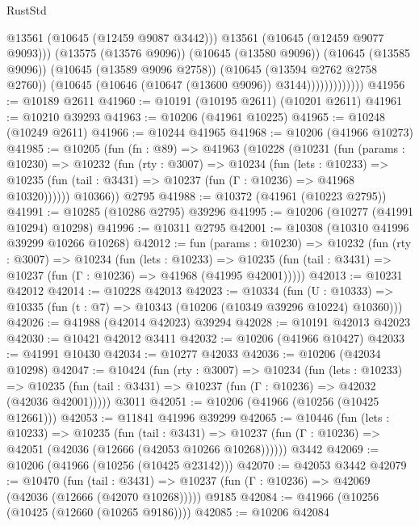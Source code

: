 \begin{lexlean}{RustStd}
\begin{coremodule}
                              @13561
                              (@10645 (@12459 @9087 @3442)))
                            @13561
                            (@10645 (@12459 @9077 @9093)))
                          (@13575 (@13576 @9096))
                          (@10645 (@13580 @9096))
                          (@10645 (@13585 @9096))
                          (@10645 (@13589 @9096 @2758))
                          (@10645 (@13594 @2762 @2758 @2760))
                          (@10645 (@10646 (@10647 (@13600 @9096)) @3144)))))))))))))
@41956 := @10189 @2611
@41960 := @10191 (@10195 @2611) (@10201 @2611)
@41961 := @10210 @39293
@41963 := @10206 (@41961 @10225)
@41965 := @10248 (@10249 @2611)
@41966 := @10244 @41965
@41968 := @10206 (@41966 @10273)
@41985 := @10205
    (fun (fn : @89) =>
    @41963
      (@10228
        (@10231
          (fun (params : @10230) =>
          @10232
            (fun (rty : @3007) =>
            @10234
              (fun (lets : @10233) =>
              @10235 (fun (tail : @3431) => @10237 (fun (Γ : @10236) => @41968 @10320))))))
        @10366))
    @2795
@41988 := @10372 (@41961 (@10223 @2795))
@41991 := @10285 (@10286 @2795) @39296
@41995 := @10206 (@10277 (@41991 @10294) @10298)
@41996 := @10311 @2795
@42001 := @10308 (@10310 @41996 @39299 @10266 @10268)
@42012 := fun (params : @10230) =>
  @10232
    (fun (rty : @3007) =>
    @10234
      (fun (lets : @10233) =>
      @10235 (fun (tail : @3431) => @10237 (fun (Γ : @10236) => @41968 (@41995 @42001)))))
@42013 := @10231 @42012
@42014 := @10228 @42013
@42023 := @10334
    (fun (U : @10333) => @10335 (fun (t : @7) => @10343 (@10206 (@10349 @39296 @10224) @10360)))
@42026 := @41988 (@42014 @42023) @39294
@42028 := @10191 @42013 @42023
@42030 := @10421 @42012 @3411
@42032 := @10206 (@41966 @10427)
@42033 := @41991 @10430
@42034 := @10277 @42033
@42036 := @10206 (@42034 @10298)
@42047 := @10424
    (fun (rty : @3007) =>
    @10234
      (fun (lets : @10233) =>
      @10235 (fun (tail : @3431) => @10237 (fun (Γ : @10236) => @42032 (@42036 @42001)))))
    @3011
@42051 := @10206 (@41966 (@10256 (@10425 @12661)))
@42053 := @11841 @41996 @39299
@42065 := @10446
    (fun (lets : @10233) =>
    @10235
      (fun (tail : @3431) =>
      @10237 (fun (Γ : @10236) => @42051 (@42036 (@12666 (@42053 @10266 @10268))))))
    @3442
@42069 := @10206 (@41966 (@10256 (@10425 @23142)))
@42070 := @42053 @3442
@42079 := @10470
    (fun (tail : @3431) => @10237 (fun (Γ : @10236) => @42069 (@42036 (@12666 (@42070 @10268)))))
    @9185
@42084 := @41966 (@10256 (@10425 (@12660 (@10265 @9186))))
@42085 := @10206 @42084

\end{coremodule}
\end{lexlean}
